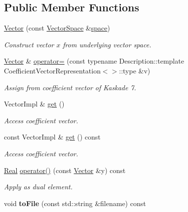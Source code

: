 \subsection*{Public Member Functions}
\begin{DoxyCompactItemize}
\item 
\hyperlink{classSpacy_1_1Kaskade_1_1Vector_a50fa434e8ca78baa9660e756eba6cfe9}{Vector} (const \hyperlink{classSpacy_1_1VectorSpace}{Vector\+Space} \&\hyperlink{classSpacy_1_1VectorBase_aa999dbf9d679d895dfe04c10fbf9f5e9}{space})
\begin{DoxyCompactList}\small\item\em Construct vector $x$ from underlying vector space. \end{DoxyCompactList}\item 
\hypertarget{classSpacy_1_1Kaskade_1_1Vector_a71e8305ae058499d3b4901808b0eb35b}{}\hyperlink{classSpacy_1_1Kaskade_1_1Vector}{Vector} \& \hyperlink{classSpacy_1_1Kaskade_1_1Vector_a71e8305ae058499d3b4901808b0eb35b}{operator=} (const typename Description\+::template Coefficient\+Vector\+Representation$<$$>$\+::type \&v)\label{classSpacy_1_1Kaskade_1_1Vector_a71e8305ae058499d3b4901808b0eb35b}

\begin{DoxyCompactList}\small\item\em Assign from coefficient vector of Kaskade 7. \end{DoxyCompactList}\item 
\hypertarget{classSpacy_1_1Kaskade_1_1Vector_ad97e7434f22fcc83f936bed977f7908a}{}Vector\+Impl \& \hyperlink{classSpacy_1_1Kaskade_1_1Vector_ad97e7434f22fcc83f936bed977f7908a}{get} ()\label{classSpacy_1_1Kaskade_1_1Vector_ad97e7434f22fcc83f936bed977f7908a}

\begin{DoxyCompactList}\small\item\em Access coefficient vector. \end{DoxyCompactList}\item 
\hypertarget{classSpacy_1_1Kaskade_1_1Vector_a7e99093175a4326eb9cb4ebea025c56a}{}const Vector\+Impl \& \hyperlink{classSpacy_1_1Kaskade_1_1Vector_a7e99093175a4326eb9cb4ebea025c56a}{get} () const \label{classSpacy_1_1Kaskade_1_1Vector_a7e99093175a4326eb9cb4ebea025c56a}

\begin{DoxyCompactList}\small\item\em Access coefficient vector. \end{DoxyCompactList}\item 
\hyperlink{classSpacy_1_1Real}{Real} \hyperlink{classSpacy_1_1Kaskade_1_1Vector_afcc468febdc597347dfdab956bdca9bd}{operator()} (const \hyperlink{classSpacy_1_1Kaskade_1_1Vector}{Vector} \&y) const 
\begin{DoxyCompactList}\small\item\em Apply as dual element. \end{DoxyCompactList}\item 
\hypertarget{classSpacy_1_1Kaskade_1_1Vector_ad61e6bf74180d7ca3d418f8390f68289}{}void {\bfseries to\+File} (const std\+::string \&filename) const \label{classSpacy_1_1Kaskade_1_1Vector_ad61e6bf74180d7ca3d418f8390f68289}


\end{DoxyCompactItemize}
